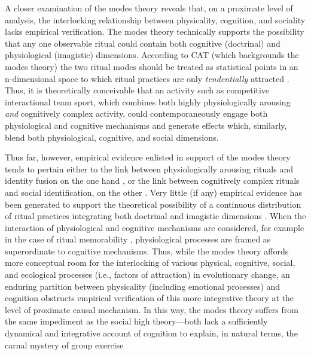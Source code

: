  A closer examination of the modes theory reveals that, on a proximate level of analysis, the interlocking relationship between physicality, cognition, and sociality lacks empirical verification.  The modes theory technically supports the possibility that any one observable ritual could contain both cognitive (doctrinal) and physiological (imagistic) dimensions.  According to CAT (which backgrounds the modes theory) the two ritual modes should be treated as statistical points in an n-dimensional space to which ritual practices are only \textit{tendentially} attracted \citep{Atkinson2011,Whitehouse2014a,Scott-Phillips2017}.  Thus, it is theoretically conceivable that an activity such as competitive interactional team sport, which combines both highly physiologically arousing \textit{and} cognitively complex activity,  could contemporaneously engage both physiological and cognitive mechanisms and generate effects which, similarly, blend both physiological, cognitive, and social dimensions.

 Thus far, however, empirical evidence enlisted in support of the modes theory tends to pertain either to the link between physiologically arousing rituals and identity fusion on the one hand \citep{Whitehouse2005}, or the link between cognitively complex rituals and social identification, on the other \citep{Whitehouse2014,Whitehouse2017,Swann2010a,Richert2005}.  Very little (if any) empirical evidence has been generated to support the theoretical possibility of a continuous distribution of ritual practices integrating both doctrinal and imagistic dimensions \citep{Atran2010}.  When the interaction of physiological and cognitive mechanisms are considered, for example in the case of ritual memorability \citep[see][]{Russell2014}, physiological processes are framed as superordinate to cognitive mechanisms.  Thus, while the modes theory affords more conceptual room for the interlocking of various physical, cognitive, social, and ecological processes (i.e., factors of attraction) in evolutionary change, an enduring partition between physicality (including emotional processes) and cognition obstructs empirical verification of this more integrative theory at the level of proximate causal mechanism.  In this way, the modes theory suffers from the same impediment as the social high theory---both lack a sufficiently dynamical and integrative account of cognition to explain, in natural terms, the carnal mystery of group exercise

